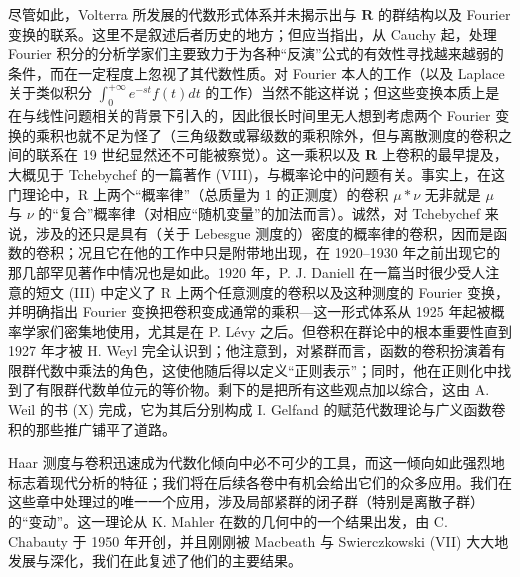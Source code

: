 尽管如此，Volterra 所发展的代数形式体系并未揭示出与 \(\mathbf{R}\) 的群结构以及 Fourier 变换的联系。这里不是叙述后者历史的地方；但应当指出，从 Cauchy 起，处理 Fourier 积分的分析学家们主要致力于为各种“反演”公式的有效性寻找越来越弱的条件，而在一定程度上忽视了其代数性质。对 Fourier 本人的工作（以及 Laplace 关于类似积分 \(\int_0^{+\infty}e^{-st}f(t)dt\) 的工作）当然不能这样说；但这些变换本质上是在与线性问题相关的背景下引入的，因此很长时间里无人想到考虑两个 Fourier 变换的乘积也就不足为怪了（三角级数或幂级数的乘积除外，但与离散测度的卷积之间的联系在 19 世纪显然还不可能被察觉）。这一乘积以及 \(\mathbf{R}\) 上卷积的最早提及，大概见于 Tchebychef 的一篇著作 (VIII)，与概率论中的问题有关。事实上，在这门理论中，R 上两个“概率律”（总质量为 1 的正测度）的卷积 \(\mu *\nu\) 无非就是 \(\mu\) 与 \(\nu\) 的“复合”概率律（对相应“随机变量”的加法而言）。诚然，对 Tchebychef 来说，涉及的还只是具有（关于 Lebesgue 测度的）密度的概率律的卷积，因而是函数的卷积；况且它在他的工作中只是附带地出现，在 1920--1930 年之前出现它的那几部罕见著作中情况也是如此。1920 年，P. J. Daniell 在一篇当时很少受人注意的短文 (III) 中定义了 R 上两个任意测度的卷积以及这种测度的 Fourier 变换，并明确指出 Fourier 变换把卷积变成通常的乘积---这一形式体系从 1925 年起被概率学家们密集地使用，尤其是在 P. Lévy 之后。但卷积在群论中的根本重要性直到 1927 年才被 H. Weyl 完全认识到；他注意到，对紧群而言，函数的卷积扮演着有限群代数中乘法的角色，这使他随后得以定义“正则表示”；同时，他在正则化中找到了有限群代数单位元的等价物。剩下的是把所有这些观点加以综合，这由 A. Weil 的书 (X) 完成，它为其后分别构成 I. Gelfand 的赋范代数理论与广义函数卷积的那些推广铺平了道路。

Haar 测度与卷积迅速成为代数化倾向中必不可少的工具，而这一倾向如此强烈地标志着现代分析的特征；我们将在后续各卷中有机会给出它们的众多应用。我们在这些章中处理过的唯一一个应用，涉及局部紧群的闭子群（特别是离散子群）的“变动”。这一理论从 K. Mahler 在数的几何中的一个结果出发，由 C. Chabauty 于 1950 年开创，并且刚刚被 Macbeath 与 Swierczkowski (VII) 大大地发展与深化，我们在此复述了他们的主要结果。


